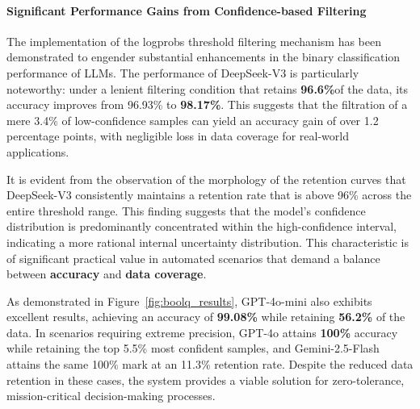 \paragraph{Significant Performance Gains from Confidence-based Filtering}

The implementation of the logprobs threshold filtering mechanism has been demonstrated to engender substantial enhancements in the binary classification performance of LLMs. The performance of DeepSeek-V3 is particularly noteworthy: under a lenient filtering condition that retains \textbf{96.6\%}of the data, its accuracy improves from 96.93\% to \textbf{98.17\%}. This suggests that the filtration of a mere 3.4\% of low-confidence samples can yield an accuracy gain of over 1.2 percentage points, with negligible loss in data coverage for real-world applications.

It is evident from the observation of the morphology of the retention curves that DeepSeek-V3 consistently maintains a retention rate that is above 96\% across the entire threshold range. This finding suggests that the model's confidence distribution is predominantly concentrated within the high-confidence interval, indicating a more rational internal uncertainty distribution. This characteristic is of significant practical value in automated scenarios that demand a balance between \textbf{accuracy} and \textbf{data coverage}.

As demonstrated in Figure~\ref{fig:boolq_results}, GPT-4o-mini also exhibits excellent results, achieving an accuracy of \textbf{99.08\%} while retaining \textbf{56.2\%} of the data. In scenarios requiring extreme precision, GPT-4o attains \textbf{100\%} accuracy while retaining the top 5.5\% most confident samples, and Gemini-2.5-Flash attains the same 100\% mark at an 11.3\% retention rate. Despite the reduced data retention in these cases, the system provides a viable solution for zero-tolerance, mission-critical decision-making processes.


